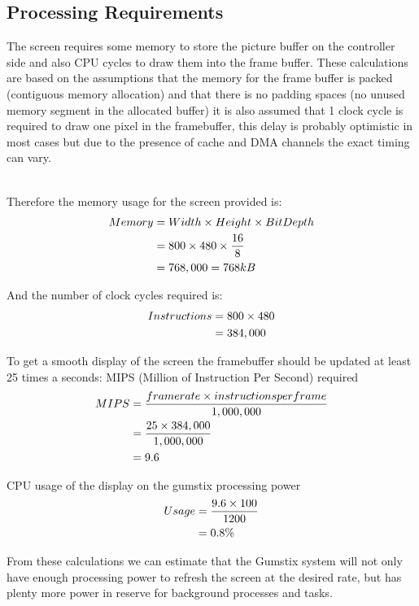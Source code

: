 \documentclass[11pt]{report} %
\begin{document}
	\subsection{Processing Requirements}
	The screen requires some memory to store the picture buffer on the  
	controller
	side and also CPU cycles to draw them into the frame buffer. These  
	calculations
	are based on the assumptions that the memory for the frame buffer is packed  
	(contiguous memory allocation) and
	that there is no padding spaces (no unused memory segment in the allocated 
	buffer) it is also assumed that 1 clock cycle is required to draw one pixel in
	the framebuffer, this delay is probably optimistic in most cases but due to 
	the presence of cache and DMA channels the exact timing can vary.\\
	\\
	\begin{center}
	Therefore the memory usage for the screen provided is:
	\begin{equation}
	\aligned
	Memory &= Width \times Height \times Bit Depth\\
	&= 800 \times 480 \times \frac{16}{8}\\
	&= 768,000 = 768kB
	\endaligned
	\end{equation}

		And the number of clock cycles required is:
		\begin{equation}
		\aligned
		Instructions &= 800 \times 480\\
		&= 384,000
		\endaligned
		\end{equation}

		To get a smooth display of the screen the framebuffer should be updated at
		least 25 times a seconds:
		MIPS (Million of Instruction Per Second) required
		\begin{equation}
		\aligned
		MIPS &= \frac{frame rate \times instructions per frame}{1,000,000}\\
		&= \frac{25 \times 384,000}{1,000,000}\\
		&= 9.6
		\endaligned
		\end{equation}

		CPU usage of the display on the gumstix processing power
		\begin{equation}
		\aligned
		Usage &= \frac{9.6 \times 100}{1200}\\
		&= 0.8 \%
		\endaligned
		\end{equation}
		\end{center}
	
		From these calculations we can estimate that the Gumstix system will not
		only have
		enough processing power to refresh the screen at the desired rate, but has
		plenty more power in reserve for background processes and tasks.
	
\end{document}
